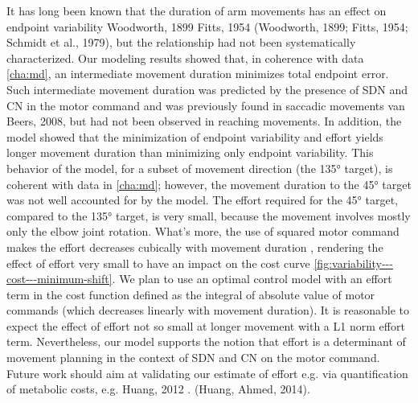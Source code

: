It has long been known that the duration of arm movements has an effect on endpoint variability  {Woodworth, 1899 }{Fitts, 1954 }(Woodworth, 1899; Fitts, 1954; Schmidt et al., 1979), but the relationship had not been systematically characterized. 
Our modeling results showed that, in coherence with data \ref{cha:md}, an intermediate movement duration minimizes total endpoint error. 
Such intermediate movement duration was predicted by the presence of SDN and CN in the motor command and was previously found in saccadic movements {van Beers, 2008}, but had not been observed in reaching movements. 
In addition, the model showed that the minimization of endpoint variability and effort yields longer movement duration than minimizing only endpoint variability.
This behavior of the model, for a subset of movement direction (the \ang{135} target), is coherent with data in \ref{cha:md}; however, the movement duration to the \ang{45} target was not well accounted for by the model. The effort required for the \ang{45} target, compared to the \ang{135} target, is very small, because the movement involves mostly only the elbow joint rotation. 
What's more, the use of squared motor command makes the effort decreases cubically with movement duration \cite{Shadmehr2016}, rendering the effect of effort very small to have an impact on the cost curve \ref{fig:variability---cost---minimum-shift}. 
We plan to use an optimal control model with an effort term in the cost function defined as the integral of absolute value of motor commands (which decreases linearly with movement duration).
It is reasonable to expect the effect of effort not so small at longer movement with a L1 norm effort term.
Nevertheless, our model supports the notion that effort is a determinant of movement planning in the context of SDN and CN on the motor command. 
Future work should aim at validating our estimate of effort e.g. via quantification of metabolic costs, e.g. {Huang, 2012 }. (Huang, Ahmed, 2014).

